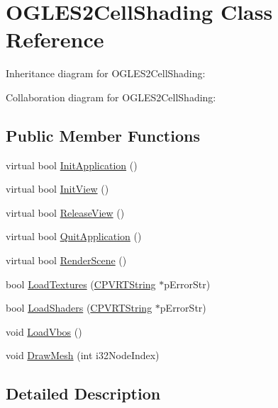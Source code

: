 \hypertarget{class_o_g_l_e_s2_cell_shading}{\section{O\+G\+L\+E\+S2\+Cell\+Shading Class Reference}
\label{class_o_g_l_e_s2_cell_shading}
}


Inheritance diagram for O\+G\+L\+E\+S2\+Cell\+Shading\+:


Collaboration diagram for O\+G\+L\+E\+S2\+Cell\+Shading\+:
\subsection*{Public Member Functions}
\begin{DoxyCompactItemize}
\item 
virtual bool \hyperlink{class_o_g_l_e_s2_cell_shading_ae74bb52c59271d33c581c59506e8eea7}{Init\+Application} ()
\item 
virtual bool \hyperlink{class_o_g_l_e_s2_cell_shading_a40a9f7a741b24cf85232f58a9ad21da5}{Init\+View} ()
\item 
virtual bool \hyperlink{class_o_g_l_e_s2_cell_shading_ae0151f54c484362573683259400cf3fb}{Release\+View} ()
\item 
virtual bool \hyperlink{class_o_g_l_e_s2_cell_shading_a11eb74773ce02078940affd3a91552c7}{Quit\+Application} ()
\item 
virtual bool \hyperlink{class_o_g_l_e_s2_cell_shading_a3d739582b1099ed60b30a953b616f5ac}{Render\+Scene} ()
\item 
bool \hyperlink{class_o_g_l_e_s2_cell_shading_af3bc77780a5d58bc79d1bd6ec49f0c27}{Load\+Textures} (\hyperlink{class_c_p_v_r_t_string}{C\+P\+V\+R\+T\+String} $\ast$p\+Error\+Str)
\item 
bool \hyperlink{class_o_g_l_e_s2_cell_shading_a1b8727b496e112eedda5f130be182d91}{Load\+Shaders} (\hyperlink{class_c_p_v_r_t_string}{C\+P\+V\+R\+T\+String} $\ast$p\+Error\+Str)
\item 
void \hyperlink{class_o_g_l_e_s2_cell_shading_a99432975bb4cade981869cacffcd5afa}{Load\+Vbos} ()
\item 
void \hyperlink{class_o_g_l_e_s2_cell_shading_a01b6507b73134a4324e1b06e503584d0}{Draw\+Mesh} (int i32\+Node\+Index)
\end{DoxyCompactItemize}


\subsection{Detailed Description}



